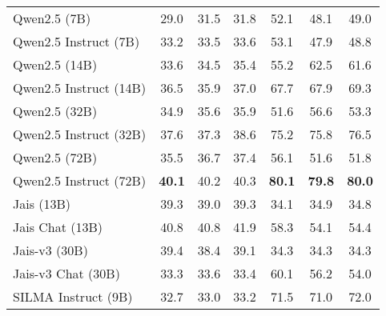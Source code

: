 \begin{table*}[t]
{\begin{tabular}{lcccccc}
\hdashline
Qwen2.5 (7B)                                  & 29.0         & 31.5           & 31.8                     & 52.1         & 48.1           & 49.0                      \\
Qwen2.5 Instruct (7B)                         & 33.2         & 33.5           & 33.6                     & 53.1         & 47.9           & 48.8                      \\
Qwen2.5 (14B)                                 & 33.6         & 34.5            & 35.4                      & 55.2          & 62.5            & 61.6                       \\
Qwen2.5 Instruct (14B)                        & 36.5         & 35.9            & 37.0                      & 67.7         & 67.9            & 69.3                       \\
Qwen2.5 (32B)                                 & 34.9         & 35.6           & 35.9                     & 51.6         & 56.6           & 53.3                      \\
Qwen2.5 Instruct (32B)                        & 37.6         & 37.3           & 38.6                     & 75.2         & 75.8           & 76.5                      \\
Qwen2.5 (72B)                                 & 35.5         & 36.7           & 37.4                     & 56.1         & 51.6           & 51.8                      \\
Qwen2.5 Instruct (72B)                        & \textbf{40.1}         & 40.2           & 40.3                     & \textbf{80.1}         & \textbf{79.8}           & \textbf{80.0}                      \\ 
\hline
Jais (13B)                                    & 39.3         & 39.0           & 39.3                      & 34.1         & 34.9            & 34.8                       \\
Jais Chat (13B)                               & 40.8         & 40.8           & 41.9                      & 58.3         & 54.1            & 54.4                       \\
Jais-v3 (30B)                                 & 39.4         & 38.4           & 39.1                      & 34.3         & 34.3            & 34.3                       \\
Jais-v3 Chat (30B)                            & 33.3         & 33.6            & 33.4                      & 60.1         & 56.2            & 54.0                       \\ 
\hdashline
SILMA Instruct (9B)                           & 32.7         & 33.0           & 33.2                      & 71.5         & 71.0            & 72.0                         \\ 

\end{tabular}}
\end{table*}
